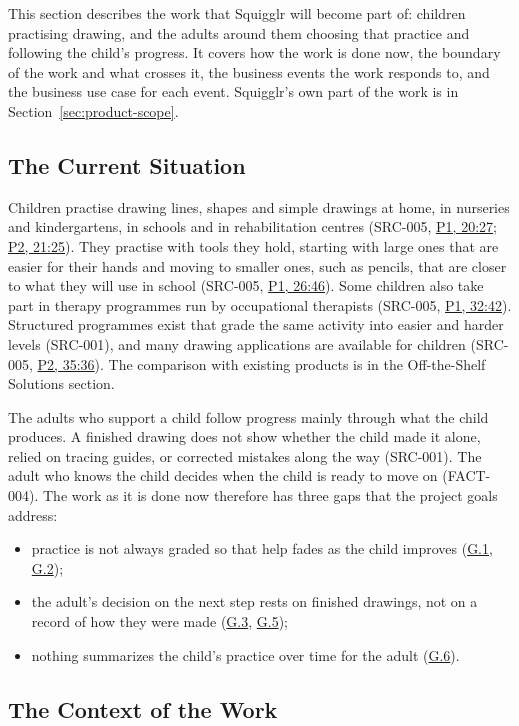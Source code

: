 \documentclass[12pt]{article}
\renewcommand{\_}{\textunderscore\allowbreak}%
\newcommand{\intlink}[3]{\hyperref[int:#1-#2]{#3}}
\newcommand{\intref}[2]{\intlink{#1}{#2}{#1, #2}}
\newcommand{\goalref}[1]{\hyperref[goal:#1]{G.#1}}
\begin{document}
This section describes the work that Squigglr will become part of: children
practising drawing, and the adults around them choosing that practice and
following the child's progress. It covers how the work is done now, the boundary
of the work and what crosses it, the business events the work responds to, and
the business use case for each event. Squigglr's own part of the work is in
Section~\ref{sec:product-scope}.

\subsection{The Current Situation}
\label{sec:current-situation}

Children practise drawing lines, shapes and simple drawings at home, in
nurseries and kindergartens, in schools and in rehabilitation centres (SRC-005,
\intref{P1}{20:27}; \intref{P2}{21:25}). They practise with tools they hold,
starting with large ones that are easier for their hands and moving to smaller
ones, such as pencils, that are closer to what they will use in school (SRC-005,
\intref{P1}{26:46}). Some children also take part in therapy programmes run by
occupational therapists (SRC-005, \intref{P1}{32:42}). Structured programmes
exist that grade the same activity into easier and harder levels (SRC-001), and
many drawing applications are available for children (SRC-005,
\intref{P2}{35:36}). The comparison with existing products is in the
Off-the-Shelf Solutions section.

The adults who support a child follow progress mainly through what the child
produces. A finished drawing does not show whether the child made it alone,
relied on tracing guides, or corrected mistakes along the way (SRC-001). The
adult who knows the child decides when the child is ready to move on (FACT-004).
The work as it is done now therefore has three gaps that the project goals
address:
\begin{itemize}
  \item practice is not always graded so that help fades as the child improves
  (\goalref{1}, \goalref{2});
  \item the adult's decision on the next step rests on finished drawings, not on
  a record of how they were made (\goalref{3}, \goalref{5});
  \item nothing summarizes the child's practice over time for the adult
  (\goalref{6}).
\end{itemize}

\subsection{The Context of the Work}
\label{sec:work-context}
\end{document}
